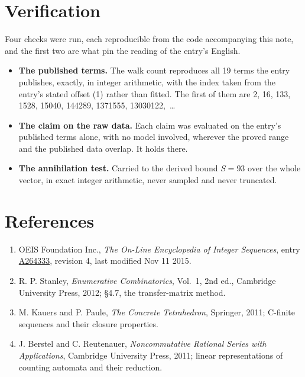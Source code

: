 \documentclass[11pt]{article}
\theoremstyle{definition}
\begin{document}
\section{Verification}

Four checks were run, each reproducible from the code accompanying this note, and the first two are what pin the reading of the entry's English.

\begin{itemize}

\item {\bfseries The published terms.} The walk count reproduces all 19 terms the entry publishes, exactly, in integer arithmetic, with the index taken from the entry's stated offset (1) rather than fitted. The first of them are 2, 16, 133, 1528, 15040, 144289, 1371555, 13030122,~\dots

\item {\bfseries The claim on the raw data.} Each claim was evaluated on the entry's published terms alone, with no model involved, wherever the proved range and the published data overlap. It holds there.

\item {\bfseries The annihilation test.} Carried to the derived bound $S = 93$ over the whole vector, in exact integer arithmetic, never sampled and never truncated.

\end{itemize}

\section{References}

\begin{enumerate}

\item OEIS Foundation Inc., \emph{The On-Line Encyclopedia of Integer Sequences}, entry \href{https://oeis.org/A264333}{A264333}, revision 4, last modified Nov 11 2015.

\item R. P. Stanley, \emph{Enumerative Combinatorics}, Vol.~1, 2nd ed., Cambridge University Press, 2012; \S4.7, the transfer-matrix method.

\item M. Kauers and P. Paule, \emph{The Concrete Tetrahedron}, Springer, 2011; C-finite sequences and their closure properties.

\item J. Berstel and C. Reutenauer, \emph{Noncommutative Rational Series with Applications}, Cambridge University Press, 2011; linear representations of counting automata and their reduction.

\end{enumerate}
\end{document}
